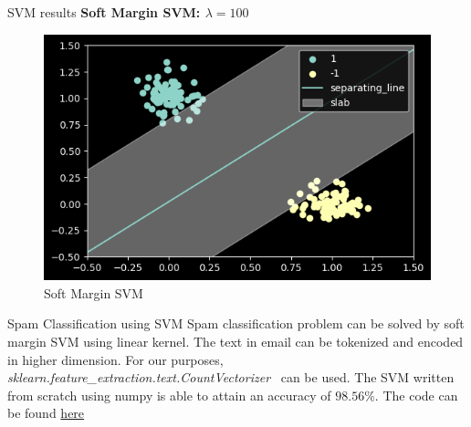 \documentclass{beamer}
\begin{document}
\begin{frame}{SVM results}
    \textbf{Soft Margin SVM: $\lambda = 100$}
    \begin{figure}[H]
        \centering
        \includegraphics[scale=0.5]{../../results/softmargin.png}
        \caption{Soft Margin SVM}
        \label{softmargin}
    \end{figure}
\end{frame}

\begin{frame}{Spam Classification using SVM}
    Spam classification problem can be solved by soft margin SVM using linear kernel. The text in email can be tokenized and encoded in higher dimension. For our purposes, \emph{sklearn.feature\_extraction.text.CountVectorizer}~\cite{scikit-learn} can be used. The SVM written from scratch using numpy is able to attain an accuracy of $98.56\%$. The code can be found \href{https://github.com/cmaspi/subgradient\_method/blob/main/code/spam\_classification.ipynb}{here}
\end{frame}    



{\small


}


\end{document}
